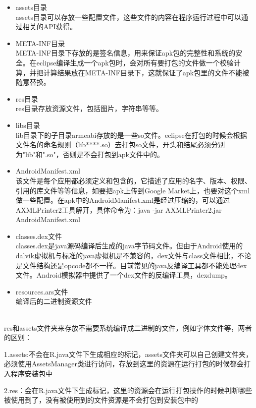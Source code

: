 \begin{itemize}
\item assets目录\\
assets目录可以存放一些配置文件，这些文件的内容在程序运行过程中可以通过相关的API获得。

\item META-INF目录\\
META-INF目录下存放的是签名信息，用来保证apk包的完整性和系统的安全。在eclipse编译生成一个apk包时，会对所有要打包的文件做一个校验计算，并把计算结果放在META-INF目录下，这就保证了apk包里的文件不能被随意替换。

\item res目录\\
res目录存放资源文件，包括图片，字符串等等。

\item libs目录\\
lib目录下的子目录armeabi存放的是一些so文件。eclipse在打包的时候会根据文件名的命名规则（lib****.so）去打包so文件，开头和结尾必须分别为"lib"和".so"，否则是不会打包到apk文件中的。

\item AndroidManifest.xml\\
该文件是每个应用都必须定义和包含的，它描述了应用的名字、版本、权限、引用的库文件等等信息，如要把apk上传到Google Market上，也要对这个xml做一些配置。在apk中的AndroidManifest.xml是经过压缩的，可以通过AXMLPrinter2工具解开，具体命令为：java -jar AXMLPrinter2.jar AndroidManifest.xml

\item classes.dex文件\\
 classes.dex是java源码编译后生成的java字节码文件。但由于Android使用的dalvik虚拟机与标准的java虚拟机是不兼容的，dex文件与class文件相比，不论是文件结构还是opcode都不一样。目前常见的java反编译工具都不能处理dex文件。Android模拟器中提供了一个dex文件的反编译工具，dexdump。

\item resources.ars文件\\
编译后的二进制资源文件
\end{itemize}

\\
res和assets文件夹来存放不需要系统编译成二进制的文件，例如字体文件等，两者的区别：

1.assets:不会在R.java文件下生成相应的标记，assets文件夹可以自己创建文件夹，必须使用AssetsManager类进行访问，存放到这里的资源在运行打包的时候都会打入程序安装包中

2.res：会在R.java文件下生成标记，这里的资源会在运行打包操作的时候判断哪些被使用到了，没有被使用到的文件资源是不会打包到安装包中的

